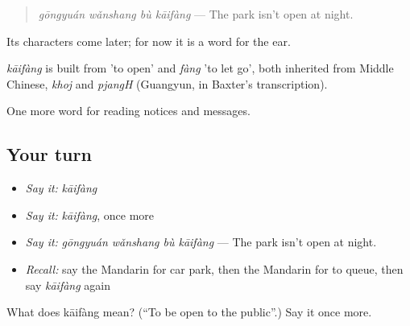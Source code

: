\begin{quote}
\emph{gōngyuán wǎnshang bù kāifàng} — The park isn't open at night.
\end{quote}

Its characters come later; for now it is a word for the ear.

\begin{cousinweb}
\emph{kāifàng} is built from  'to open' and \emph{fàng} 'to let go', both inherited from Middle Chinese, \emph{khoj} and \emph{pjangH} (Guangyun, in Baxter's transcription).
\end{cousinweb}

\begin{grammarlens}[title={What you've built}]
One more word for reading notices and messages.
\end{grammarlens}

\subsection*{Your turn}
\begin{itemize}
\raggedright
  \item \emph{Say it:} \emph{kāifàng}
  \item \emph{Say it:} \emph{kāifàng}, once more
  \item \emph{Say it:} \emph{gōngyuán wǎnshang bù kāifàng} — The park isn't open at night.
  \item \emph{Recall:} say the Mandarin for car park, then the Mandarin for to queue, then say \emph{kāifàng} again
\end{itemize}

\begin{tcolorbox}[breakable,colback=teal!4,colframe=teal!35!black,title={Before you move on}]
What does kāifàng mean? (\textquotedblleft{}To be open to the public\textquotedblright{}.) Say it once more.
\end{tcolorbox}
